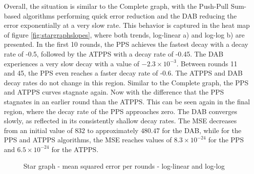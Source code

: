 Overall, the situation is similar to the Complete graph, with the Push-Pull Sum-based algorithms performing quick error reduction and the DAB reducing the error exponentially at a very slow rate. This behavior is captured in the heat map of figure \ref{fig:stargraphslopes}, where both trends, log-linear a) and log-log b) are presented. In the first 10 rounds, the PPS achieves the fastest decay with a decay rate of -0.5, followed by the ATPPS with a decay rate of -0.45. The DAB experiences a very slow decay with a value of $-2.3 \times 10^{-3}$. Between rounds 11 and 45, the PPS even reaches a faster decay rate of -0.6. The ATPPS and DAB decay rates do not change in this region. Similar to the Complete graph, the PPS and ATPPS curves stagnate again. Now with the difference that the PPS stagnates in an earlier round than the ATPPS. This can be seen again in the final region, where the decay rate of the PPS approaches zero. The DAB converges slowly, as reflected in its consistently shallow decay rates. The MSE decreases from an initial value of $832$ to approximately $480.47$ for the DAB, while for the PPS and ATPPS algorithms, the MSE reaches values of $8.3\times 10^{-24}$ for the PPS and $6.5 \times 10^{-24}$ for the ATPPS.

\begin{figure}[!ht]
    \centering
    \hfil
    \caption{Star graph - mean squared error per rounds - log-linear and log-log}
        \label{fig:stargraphMSEperRoundLogLog}
\end{figure}

